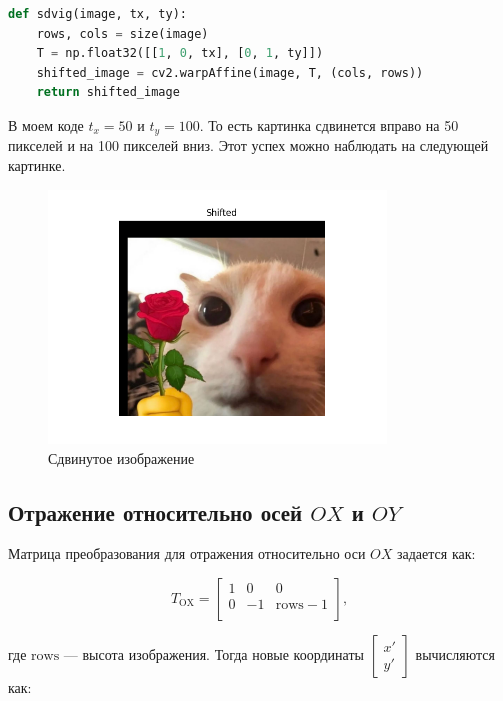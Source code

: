 \documentclass[a4paper,12pt]{article}
\begin{document}
\begin{lstlisting}[language=Python, caption=Функция сдвига изображения]
def sdvig(image, tx, ty):
    rows, cols = size(image)
    T = np.float32([[1, 0, tx], [0, 1, ty]])
    shifted_image = cv2.warpAffine(image, T, (cols, rows))
    return shifted_image
\end{lstlisting}

В моем коде \( t_x = 50 \) и \( t_y = 100 \). То есть картинка сдвинется вправо на 50 пикселей и на 100 пикселей вниз. Этот успех можно наблюдать на следующей картинке.

\begin{figure}[H]
    \centering
    \includegraphics[width=0.8\textwidth]{lab2/task1/Figure_2.png}
    \caption{Сдвинутое изображение}
    \label{fig:shifted_image}
\end{figure}

\subsection{Отражение относительно осей \( OX \) и \( OY \)}

Матрица преобразования для отражения относительно оси \( OX \) задается как:

\[
T_{\text{OX}} = \begin{bmatrix}
1 & 0 & 0 \\
0 & -1 & \text{rows} - 1 \\
\end{bmatrix},
\]

где \(\text{rows}\) — высота изображения. Тогда новые координаты \( \begin{bmatrix} x' \\ y' \end{bmatrix} \) вычисляются как:
\end{document}
